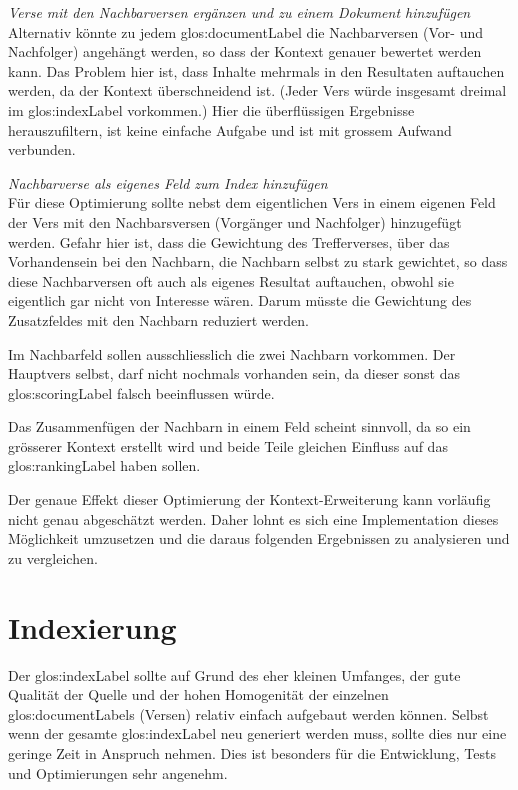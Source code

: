 \vspace{0.5em}
\textit{Verse mit den Nachbarversen ergänzen und zu einem Dokument hinzufügen}
\vspace{0.5em}\\
Alternativ könnte zu jedem \gls{glos:documentLabel} die Nachbarversen (Vor- und Nachfolger) angehängt werden, so dass der Kontext genauer bewertet werden kann.
Das Problem hier ist, dass Inhalte mehrmals in den Resultaten auftauchen werden, da der Kontext überschneidend ist. (Jeder Vers würde insgesamt dreimal im \gls{glos:indexLabel} vorkommen.)
Hier die überflüssigen Ergebnisse herauszufiltern, ist keine einfache Aufgabe und ist mit grossem Aufwand verbunden.

\vspace{0.5em}
\textit{Nachbarverse als eigenes Feld zum Index hinzufügen}
\vspace{0.5em}\\
Für diese Optimierung sollte nebst dem eigentlichen Vers in einem eigenen Feld der Vers mit den Nachbarsversen (Vorgänger und Nachfolger) hinzugefügt werden.
Gefahr hier ist, dass die Gewichtung des Trefferverses, über das Vorhandensein bei den Nachbarn, die Nachbarn selbst zu stark gewichtet, so dass diese Nachbarversen oft auch als eigenes Resultat auftauchen, obwohl sie eigentlich gar nicht von Interesse wären. Darum müsste die Gewichtung des Zusatzfeldes mit den Nachbarn reduziert werden.

Im Nachbarfeld sollen ausschliesslich die zwei Nachbarn vorkommen. Der Hauptvers selbst, darf nicht nochmals vorhanden sein, da dieser sonst das \gls{glos:scoringLabel} falsch beeinflussen würde.

Das Zusammenfügen der Nachbarn in einem Feld scheint sinnvoll, da so ein grösserer Kontext erstellt wird und beide Teile gleichen Einfluss auf das \gls{glos:rankingLabel} haben sollen.

Der genaue Effekt dieser Optimierung der Kontext-Erweiterung kann vorläufig nicht genau abgeschätzt werden.
Daher lohnt es sich eine Implementation dieses Möglichkeit umzusetzen und die daraus folgenden Ergebnissen zu analysieren und zu vergleichen.


\section{Indexierung}
\label{sec:indexing}
Der \gls{glos:indexLabel} sollte auf Grund des eher kleinen Umfanges, der gute Qualität der Quelle und der hohen Homogenität der einzelnen \glspl{glos:documentLabel} (Versen) relativ einfach aufgebaut werden können.
Selbst wenn der gesamte \gls{glos:indexLabel} neu generiert werden muss, sollte dies nur eine geringe Zeit in Anspruch nehmen.
Dies ist besonders für die Entwicklung, Tests und Optimierungen sehr angenehm.

